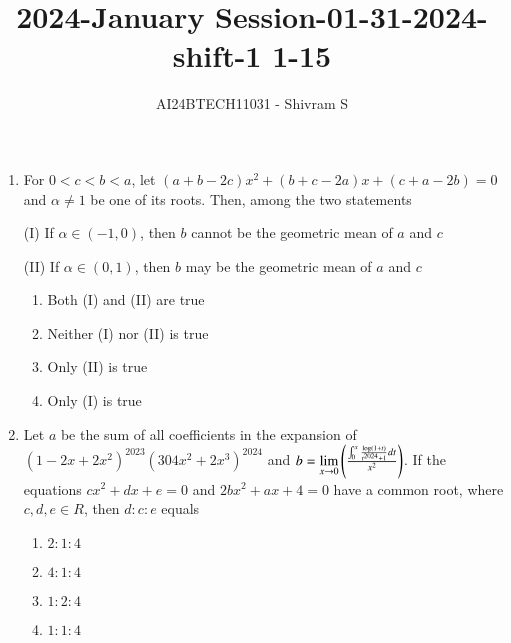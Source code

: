 \documentclass[journal]{IEEEtran}
\begin{document}

\onecolumn

\title{2024-January Session-01-31-2024-shift-1 1-15}
\author{AI24BTECH11031 - Shivram S}
\maketitle
\bigskip

\renewcommand{\thefigure}{\theenumi}
\renewcommand{\thetable}{\theenumi}

\begin{enumerate}


    
    \item For $0 < c < b < a$, let $(a + b - 2c)x^2 + (b + c - 2a)x
    + (c + a - 2b) = 0$ and $\alpha \ne 1$ be one of its roots.
    Then, among the two statements
    
    (I) If $\alpha \in (-1, 0)$, then $b$ cannot be the geometric
    mean of $a$ and $c$
    
    (II) If $\alpha \in (0, 1)$, then $b$ may be the geometric
    mean of $a$ and $c$

    \begin{multicols}{2}
\begin{enumerate}

        \item Both (I) and (II) are true
        \item Neither (I) nor (II) is true
        \item Only (II) is true
        \item Only (I) is true
    \end{enumerate}
\end{multicols}

    \item Let $a$ be the sum of all coefficients in the
    expansion of $(1 - 2x + 2x^2)^{2023} (3 0 4x^2+2x^3)^{2024}$
    and $b = \lim\limits_{x \to 0} \left(\frac{\int_0^x \frac{\log(1+t)}{t^{2024} + 1} dt} {x^2}\right)$.
    If the equations $cx^2 + dx + e = 0$ and $2bx^2 + ax + 4 = 0$
    have a common root, where $c, d, e \in R$, then $d : c : e$ equals
    
    \begin{multicols}{4}
\begin{enumerate}

        \item $2:1:4$
        \item $4:1:4$
        \item $1:2:4$
        \item $1:1:4$
    \end{enumerate}
\end{multicols}


\end{enumerate}
\end{document}
